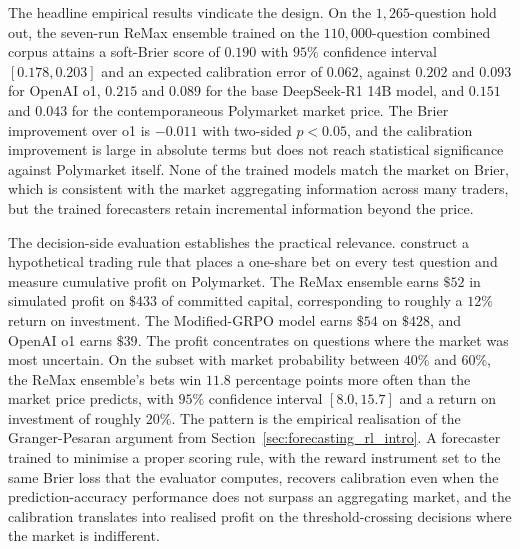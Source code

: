 The headline empirical results vindicate the design. On the $1{,}265$-question hold
out, the seven-run ReMax ensemble trained on the $110{,}000$-question combined
corpus attains a soft-Brier score of $0.190$ with $95\%$ confidence interval
$[0.178, 0.203]$ and an expected calibration error of $0.062$, against $0.202$ and
$0.093$ for OpenAI o1, $0.215$ and $0.089$ for the base DeepSeek-R1 14B model, and
$0.151$ and $0.043$ for the contemporaneous Polymarket market price. The Brier
improvement over o1 is $-0.011$ with two-sided $p < 0.05$, and the calibration
improvement is large in absolute terms but does not reach statistical significance
against Polymarket itself. None of the trained models match the market on Brier,
which is consistent with the market aggregating information across many traders,
but the trained forecasters retain incremental information beyond the price.

The decision-side evaluation establishes the practical relevance. \citet{Turtel2025}
construct a hypothetical trading rule that places a one-share bet on every test
question and measure cumulative profit on Polymarket. The ReMax ensemble earns
$\$52$ in simulated profit on $\$433$ of committed capital, corresponding to
roughly a $12\%$ return on investment. The Modified-GRPO model earns $\$54$ on
$\$428$, and OpenAI o1 earns $\$39$. The profit concentrates on questions where
the market was most uncertain. On the subset with market probability between $40\%$
and $60\%$, the ReMax ensemble's bets win $11.8$ percentage points more often than
the market price predicts, with $95\%$ confidence interval $[8.0, 15.7]$ and a
return on investment of roughly $20\%$. The pattern is the empirical realisation of
the Granger-Pesaran argument from
Section~\ref{sec:forecasting_rl_intro}. A forecaster trained to minimise a proper
scoring rule, with the reward instrument set to the same Brier loss that the
evaluator computes, recovers calibration even when the prediction-accuracy
performance does not surpass an aggregating market, and the calibration translates
into realised profit on the threshold-crossing decisions where the market is
indifferent.

